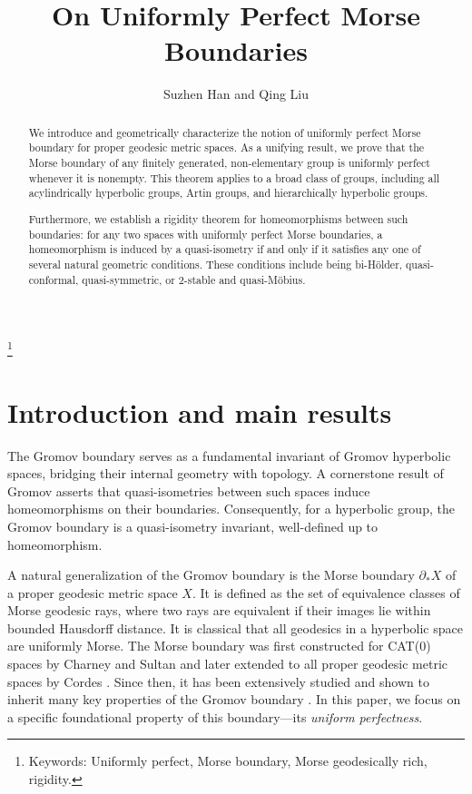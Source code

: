\documentclass[a4paper,11pt,oneside]{article}
\begin{document}
\title{On Uniformly Perfect Morse Boundaries}
\author{Suzhen Han and Qing Liu}


\maketitle
 


\begin{abstract}
 We introduce and geometrically characterize the notion of uniformly perfect Morse boundary for proper geodesic metric spaces. As a unifying result, we prove that the Morse boundary of any finitely generated, non-elementary group is uniformly perfect whenever it is nonempty. This theorem applies to a broad class of groups, including all acylindrically hyperbolic groups, Artin groups, and hierarchically hyperbolic groups.
 
 Furthermore, we establish a rigidity theorem for homeomorphisms between such boundaries: for any two spaces with uniformly perfect Morse boundaries, a homeomorphism is induced by a quasi-isometry if and only if it satisfies any one of several natural geometric conditions. These conditions include being bi-H\"older, quasi-conformal, quasi-symmetric, or $2$-stable and quasi-M\"obius.
\end{abstract}

\renewcommand{\thefootnote}{\alph{footnote}}
\setcounter{footnote}{-1} \footnote{Keywords: Uniformly perfect, Morse boundary,  Morse geodesically rich, rigidity.}



\section{Introduction and main results}

The Gromov boundary serves as a fundamental invariant of Gromov hyperbolic spaces, bridging their internal geometry with topology. 
A cornerstone result of Gromov \cite{Gromov87} asserts that quasi-isometries between such spaces induce homeomorphisms on their boundaries. Consequently, for a hyperbolic group, the Gromov boundary is a quasi-isometry invariant, well-defined up to homeomorphism.
 
A natural generalization of the Gromov boundary is the Morse boundary $\partial_*X$ of a proper geodesic metric space $X$. It is defined as the set of equivalence classes of Morse geodesic rays, where two rays are equivalent if their images lie within bounded Hausdorff distance. It is classical that all geodesics in a hyperbolic space are uniformly Morse. 
The Morse boundary was first constructed for CAT(0) spaces by Charney and Sultan \cite{CharneySultan15} and later extended to all proper geodesic metric spaces by Cordes \cite{Cordes17}. 
Since then, it has been extensively studied and shown to inherit many key properties of the Gromov boundary \cite{CharneyCordesMurray19, CharneyCordesSisto23, CordesDurham19, CordesHume17, Merlin21, Liu21, Liu22, MousleyRussell19, Murray19, Zbinden23, Zbinden24}. In this paper, we focus on a specific foundational property of this boundary—its \textit{uniform perfectness}.
\end{document}
